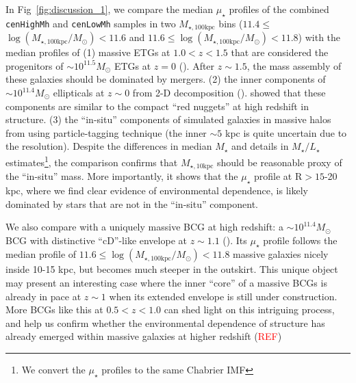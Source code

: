 \documentclass{emulateapj}
\def\rbcg{\texttt{cenHighMh}}
\def\nbcg{\texttt{cenLowMh}}
\def\mstar{{$M_{\star}$}}
\def\minn{{$M_{\star,10\mathrm{kpc}}$}}
\def\mtot{{$M_{\star,100\mathrm{kpc}}$}}
\def\logmtot{{$\log (M_{\star,100\mathrm{kpc}}/M_{\odot})$}}
\def\m2l{{$M_{\star}/L_{\star}$}}
\def\mden{{$\mu_{\star}$}}
\newcommand{\addref}{{\textcolor{red}{REF}}}
\begin{document}
\begin{CJK*}{UTF8}{gbsn}
    In Fig~\ref{fig:discussion_1}, we compare the median \mden{} profiles of the 
    combined \rbcg{} and \nbcg{} samples in two \mtot{} bins 
    ($11.4\leq$\logmtot{}$<11.6$ and $11.6\leq$\logmtot{}$<11.8$) with the median 
    profiles of 
    (1) massive ETGs at $1.0 < z < 1.5$ that are considered the progenitors of 
    $\sim 10^{11.5} M_{\odot}$ ETGs at $z=0$ (\citealt{Patel2013}).  
    After $z\sim 1.5$, the mass assembly of these galaxies should be dominated by 
    mergers. 
    (2) the inner components of $\sim 10^{11.4} M_{\odot}$ ellipticals at $z\sim 0$ 
    from 2-D decomposition (\citealt{Huang2013a}). 
    \citet{Huang2013b} showed that these components are similar to the compact 
    ``red nuggets'' at high redshift in structure. 
    (3) the ``in-situ'' components of simulated galaxies in massive halos from 
    \citet{Cooper13} using particle-tagging technique (the inner $\sim 5$ kpc is 
    quite uncertain due to the resolution).  
    Despite the differences in median \mstar{} and details in \m2l{} 
    estimates\footnote{We convert the \mden{} profiles to the same Chabrier IMF}, 
    the comparison confirms that \minn{} should be reasonable proxy of the 
    ``in-situ'' mass.  
    More importantly, it shows that the \mden{} profile at $\mathrm{R} > 15$-20 kpc, 
    where we find clear evidence of environmental dependence, is likely dominated by 
    stars that are not in the ``in-situ'' component.  
    
    
    We also compare with a uniquely massive BCG at high redshift: 
    a $\sim 10^{11.4} M_{\odot}$ BCG with distinctive ``cD''-like envelope at 
    $z\sim 1.1$ (\citealt{Liu2013}).  
    Its \mden{} profile follows the median profile of $11.6\leq$\logmtot{}$<11.8$ 
    massive galaxies nicely inside 10-15 kpc, but becomes much steeper in the outskirt.  
    This unique object may present an interesting case where the inner ``core'' of a 
    massive BCGs is already in pace at $z\sim 1$ when its extended envelope is still
    under construction.
    More BCGs like this at $0.5 < z < 1.0$ can shed light on this intriguing 
    process, and help us confirm whether the environmental dependence of structure 
    has already emerged within massive galaxies at higher redshift (\addref{})
    

\end{CJK*}
\end{document}
